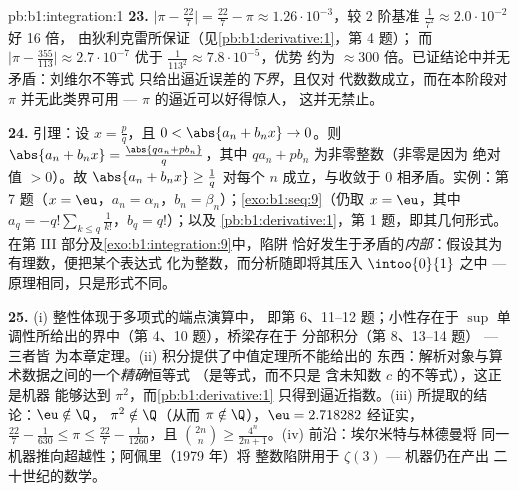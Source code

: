 \begin{solution}{pb:b1:integration:1}
\textbf{23.} $\bigl|\pi - \frac{22}{7}\bigr| = \frac{22}{7} -
\pi \approx 1.26\cdot10^{-3}$，较
$2$ 阶基准 $\frac{1}{7^2} \approx 2.0\cdot10^{-2}$ 好 16 倍，
由狄利克雷所保证（见\cref{pb:b1:derivative:1}，第 4 题）；
而 $\bigl|\pi - \frac{355}{113}\bigr| \approx 2.7\cdot10^{-7}$
优于 $\frac{1}{113^2} \approx 7.8\cdot10^{-5}$，优势
约为 $\approx 300$ 倍。已证结论中并无矛盾：刘维尔不等式
只给出逼近误差的\emph{下界}，且仅对
代数数成立，而在本阶段对 $\pi$ 并无此类界可用
--- $\pi$ 的逼近可以好得惊人，
这并无禁止。

\textbf{24.} 引理：设 $x = \frac pq$，且 $0 < \abs{a_n +
b_n x} \to 0$。则 $\abs{a_n + b_n x} = \frac{\abs{q a_n + p
b_n}}{q}$，其中 $q a_n + p b_n$ 为非零整数（非零是因为
绝对值 $> 0$）。故 $\abs{a_n + b_n x}
\geq \frac1q$ 对每个 $n$ 成立，与收敛于
$0$ 相矛盾。实例：第 7 题（$x = \eu$，$a_n = \alpha_n$，$b_n =
\beta_n$）；\cref{exo:b1:seq:9}（仍取 $x = \eu$，其中 $a_q =
-q!\sum_{k \leq q}\frac{1}{k!}$，$b_q = q!$）；以及
\cref{pb:b1:derivative:1}，第 1 题，即其几何形式。
在第 III 部分及\cref{exo:b1:integration:9}中，陷阱
恰好发生于矛盾的\emph{内部}：假设其为有理数，便把某个表达式
化为整数，而分析随即将其压入
$\intoo{0}{1}$ 之中 --- 原理相同，只是形式不同。

\textbf{25.} (i) 整性体现于多项式的端点演算中，
即第 6、11--12 题；小性存在于
$\sup$ 单调性所给出的界中（第 4、10 题），桥梁存在于
分部积分（第 8、13--14 题） --- 三者皆
为本章定理。(ii) 积分提供了中值定理所不能给出的
东西：解析对象与算术数据之间的一个\emph{精确}恒等式
（是等式，而不只是
含未知数 $c$ 的不等式），这正是机器
能够达到 $\pi^2$，而\cref{pb:b1:derivative:1}
只得到逼近指数。(iii) 所提取的结论：$\eu \notin \Q$，
$\pi^2 \notin \Q$（从而 $\pi \notin \Q$），$\eu = 2.718282$
经证实，$\frac{22}{7} - \frac{1}{630} \leq \pi \leq
\frac{22}{7} - \frac{1}{1260}$，且 $\binom{2n}{n} \geq
\frac{4^n}{2n+1}$。(iv) 前沿：埃尔米特与林德曼将
同一机器推向超越性；阿佩里（1979 年）将
整数陷阱用于 $\zeta(3)$ --- 机器仍在产出
二十世纪的数学。
\end{solution}
